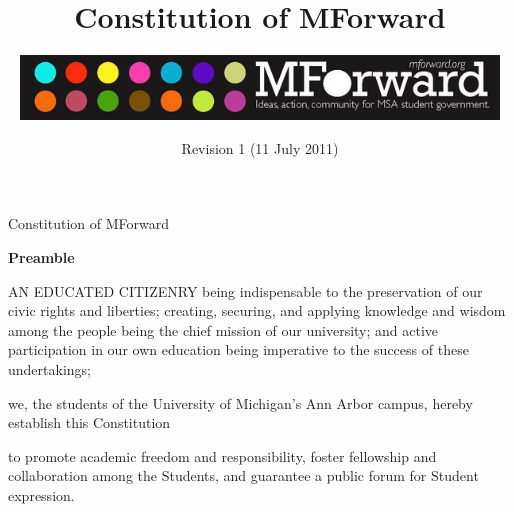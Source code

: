 \documentclass{constitution}
\begin{document}
	\renewcommand{\thepage}{\roman{page}}
	\title{Constitution of MForward}
	\author{\includegraphics[width=5in]{MForwardLogo.jpg}}
	\date{Revision 1 (11 July 2011)}
	\maketitle
	\tableofcontents
	\newpage

	\renewcommand{\thepage}{\arabic{page}}
	\setcounter{page}{1}
	\pagestyle{fancy}
	\headheight 35pt
	\linenumbers
	
	\begin{center}
		\Large Constitution of MForward
	\end{center}
	
	\begin{center}
		\bfseries Preamble
	\end{center}

	AN EDUCATED CITIZENRY being indispensable to the preservation of our civic rights and liberties; creating, securing, and applying knowledge and wisdom among the people being the chief mission of our university; and active participation in our own education being imperative to the success of these undertakings;

	    we, the students of the University of Michigan's Ann Arbor campus, hereby establish this Constitution

	to promote academic freedom and responsibility, foster fellowship and collaboration among the Students, and guarantee a public forum for Student expression.
	

	

	
	
	
	
	
	
	
	
	
	

	
	
	
\end{document}
